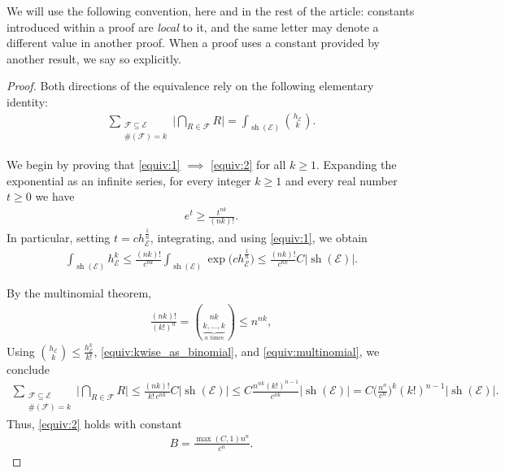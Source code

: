 \documentclass[oneside]{amsart}
\theoremstyle{definition}
\theoremstyle{plain}
\numberwithin{equation}{section}
\numberwithin{theorem}{section}
\newcommand{\sh}{\operatorname{sh}}
\begin{document}
We will use the following convention, here and in the rest of the article:
constants introduced within a proof are \emph{local} to it, and the same letter
may denote a different value in another proof.
When a proof uses a constant provided by another result, we say so explicitly.
\begin{proof}
  Both directions of the equivalence rely on the following elementary identity:
  \begin{align} \label{equiv:kwise_as_binomial}
    \sum_{\substack{\mathcal{F} \subseteq \mathcal{E} \\
      \#(\mathcal{F}) = k
    }} \Big|
      \bigcap_{R \in \mathcal{F}} R
    \Big|
    = \int_{\sh(\mathcal{E})} \binom{h_{\mathcal{E}}}{k}.
  \end{align}

  We begin by proving that \ref{equiv:1} $\implies$ \ref{equiv:2} for all
  $k \geq 1$.
  Expanding the exponential as an infinite series, for every integer $k \geq 1$
  and every real number $t \geq 0$ we have
  \begin{align*}
    e^t \geq \frac{t^{nk}}{(nk)!}.
  \end{align*}
  In particular, setting $t = c h_{\mathcal{E}}^{\frac{1}{n}}$,
  integrating, and using \ref{equiv:1},  we obtain
  \begin{align*}
    \int_{\sh(\mathcal{E})} h_{\mathcal{E}}^k
    \leq \frac{(nk)!}{c^{nk}} \int_{\sh(\mathcal{E})} \exp\big(
      c h_{\mathcal{E}}^{\frac{1}{n}} \big)
    \leq \frac{(nk)!}{c^{nk}} C |\sh(\mathcal{E})|.
  \end{align*}

  By the multinomial theorem,
  \begin{align} \label{equiv:multinomial}
    \frac{(nk)!}{(k!)^n} = \binom{nk}{
      \underbrace{k, \dots, k}_{\text{$n$ times}}} \leq n^{nk},
  \end{align}
  Using $\binom{h_{\mathcal{E}}}{k} \leq \frac{h_{\mathcal{E}}^k}{k!}$,
  \eqref{equiv:kwise_as_binomial}, and \eqref{equiv:multinomial}, we conclude
  \begin{align*}
    \sum_{\substack{\mathcal{F} \subseteq \mathcal{E} \\
      \#(\mathcal{F}) = k
    }} \Big|
      \bigcap_{R \in \mathcal{F}} R
    \Big|
    \leq \frac{(nk)!}{k! \, c^{nk}} C |\sh(\mathcal{E})|
    \leq C \frac{n^{nk} (k!)^{n-1}}{c^{nk}} |\sh(\mathcal{E})|
    = C \bigg( \frac{n^n}{c^n} \bigg)^k (k!)^{n-1} |\sh(\mathcal{E})|.
  \end{align*}
  Thus, \ref{equiv:2} holds with constant
  \begin{align*}
    B = \frac{\max(C,1)n^n}{c^n}.
  \end{align*}


\end{proof}
\end{document}
